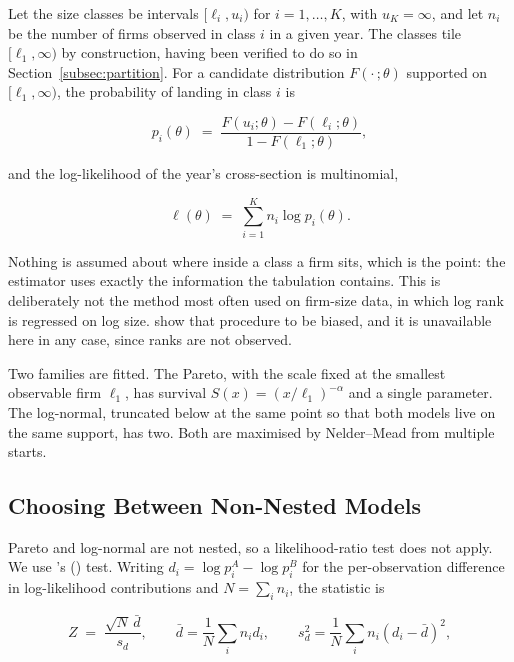 \documentclass[jrfm,article,submit,pdftex,moreauthors]{Definitions/mdpi}
\begin{document}
Let the size classes be intervals $[\ell_i, u_i)$ for $i = 1,\dots,K$, with $u_K = \infty$,
and let $n_i$ be the number of firms observed in class $i$ in a given year. The classes tile
$[\ell_1, \infty)$ by construction, having been verified to do so in
Section~\ref{subsec:partition}. For a candidate distribution $F(\cdot\,;\theta)$ supported
on $[\ell_1,\infty)$, the probability of landing in class $i$ is

\begin{equation}
p_i(\theta) \;=\; \frac{F(u_i;\theta) - F(\ell_i;\theta)}{1 - F(\ell_1;\theta)},
\label{eq:binprob}
\end{equation}

and the log-likelihood of the year's cross-section is multinomial,

\begin{equation}
\ell(\theta) \;=\; \sum_{i=1}^{K} n_i \log p_i(\theta).
\label{eq:loglik}
\end{equation}

Nothing is assumed about where inside a class a firm sits, which is the point: the estimator
uses exactly the information the tabulation contains. This is deliberately not the method
most often used on firm-size data, in which log rank is regressed on log size.
\citet{ClausetShaliziNewman2009} show that procedure to be biased, and it is unavailable here
in any case, since ranks are not observed.

Two families are fitted. The Pareto, with the scale fixed at the smallest observable firm
$\ell_1$, has survival $S(x) = (x/\ell_1)^{-\alpha}$ and a single parameter. The log-normal,
truncated below at the same point so that both models live on the same support, has two.
Both are maximised by Nelder--Mead from multiple starts.

\subsection{Choosing Between Non-Nested Models}
\label{subsec:vuong}

Pareto and log-normal are not nested, so a likelihood-ratio test does not apply. We use
\citeauthor{Vuong1989}'s (\citeyear{Vuong1989}) test. Writing $d_i = \log p_i^{A} - \log
p_i^{B}$ for the per-observation difference in log-likelihood contributions and $N = \sum_i
n_i$, the statistic is

\begin{equation}
Z \;=\; \frac{\sqrt{N}\,\bar d}{s_d}, \qquad
\bar d = \frac{1}{N}\sum_i n_i d_i, \qquad
s_d^2 = \frac{1}{N}\sum_i n_i (d_i - \bar d)^2 ,
\label{eq:vuong}
\end{equation}
\end{document}
